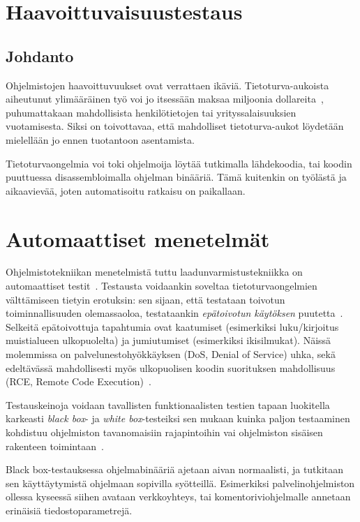 \section{Haavoittuvaisuustestaus}

\subsection{Johdanto}
Ohjelmistojen haavoittuvuukset ovat verrattaen ikäviä.
Tietoturva-aukoista aiheutunut ylimääräinen työ voi jo itsessään maksaa miljoonia dollareita~\cite{SageArtikkeli},
puhumattakaan mahdollisista henkilötietojen tai yrityssalaisuuksien vuotamisesta.
Siksi on toivottavaa, että mahdolliset tietoturva-aukot löydetään mielellään jo ennen tuotantoon asentamista.

Tietoturvaongelmia voi toki ohjelmoija löytää tutkimalla lähdekoodia,
tai koodin puuttuessa disassembloimalla ohjelman binääriä.
Tämä kuitenkin on työlästä ja aikaavievää, joten automatisoitu ratkaisu on paikallaan.

\section{Automaattiset menetelmät}

Ohjelmistotekniikan menetelmistä tuttu laadunvarmistustekniikka on automaattiset testit~\cite{Somerville}.
Testausta voidaankin soveltaa tietoturvaongelmien välttämiseen tietyin erotuksin:
sen sijaan, että testataan toivotun toiminnallisuuden olemassaoloa,
testataankin \emph{epätoivotun käytöksen} puutetta~\cite{OuluBrowser}.
Selkeitä epätoivottuja tapahtumia ovat kaatumiset (esimerkiksi luku/kirjoitus muistialueen ulkopuolelta) ja jumiutumiset (esimerkiksi ikisilmukat).
Näissä molemmissa on palvelunestohyökkäyksen (DoS, Denial of Service) uhka,
sekä edeltävässä mahdollisesti myös ulkopuolisen koodin suorituksen mahdollisuus (RCE, Remote Code Execution)~\cite{JokuLahdeTahan}.

Testauskeinoja voidaan tavallisten funktionaalisten testien tapaan luokitella karkeasti \emph{black box}- ja \emph{white box}-testeiksi sen mukaan kuinka paljon
testaaminen kohdistuu ohjelmiston tavanomaisiin rajapintoihin vai ohjelmiston sisäisen rakenteen toimintaan~\cite{Somerville}.

Black box-testauksessa ohjelmabinääriä ajetaan aivan normaalisti, ja tutkitaan sen käyttäytymistä ohjelmaan sopivilla syötteillä.
Esimerkiksi palvelinohjelmiston ollessa kyseessä siihen avataan verkkoyhteys,
tai komentoriviohjelmalle annetaan erinäisiä tiedostoparametrejä.

